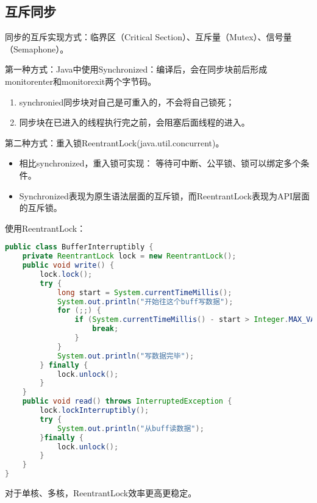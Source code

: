 \subsection{互斥同步}
同步的互斥实现方式：临界区（Critical Section）、互斥量（Mutex）、信号量（Semaphone）。
\par 第一种方式：Java中使用Synchronized：编译后，会在同步块前后形成monitorenter和monitorexit两个字节码。
\begin{enumerate}
	\item synchronied同步块对自己是可重入的，不会将自己锁死；
	\item 同步块在已进入的线程执行完之前，会阻塞后面线程的进入。
\end{enumerate}
\par 第二种方式：重入锁ReentrantLock(java.util.concurrent)。
\begin{itemize}
	\item 相比synchronized，重入锁可实现：
	等待可中断、公平锁、锁可以绑定多个条件。
	\item Synchronized表现为原生语法层面的互斥锁，而ReentrantLock表现为API层面的互斥锁。
\end{itemize}
\par 使用ReentrantLock：
\begin{lstlisting}[language=java]
public class BufferInterruptibly {
	private ReentrantLock lock = new ReentrantLock();
	public void write() {
		lock.lock();
		try {
			long start = System.currentTimeMillis();
			System.out.println("开始往这个buff写数据");
			for (;;) {
				if (System.currentTimeMillis() - start > Integer.MAX_VALUE) {
					break;
				}
			}
			System.out.println("写数据完毕");
		} finally {
			lock.unlock();
		}
	}
	public void read() throws InterruptedException {
		lock.lockInterruptibly();
		try {
			System.out.println("从buff读数据");
		}finally {
			lock.unlock();
		}
	}
}
\end{lstlisting}
\par 对于单核、多核，ReentrantLock效率更高更稳定。
